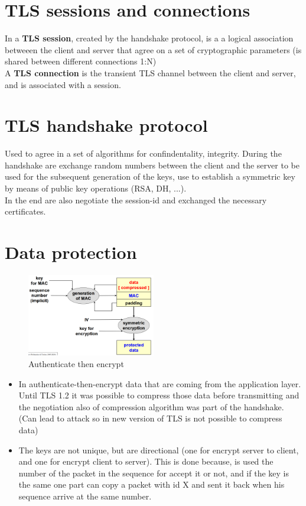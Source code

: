 \section{TLS sessions and connections}

In a \textbf{TLS session}, created by the handshake protocol, is a a logical association betweeen the client and server that agree on a set of cryptographic parameters (is shared between different connections 1:N) \\

A  \textbf{TLS connection} is the transient TLS channel between the client and server, and is associated with a session. \\

\section{TLS handshake protocol}
Used to agree in a set of algorithms for confindentality, integrity. During the handshake are exchange random numbers between the client and the server to be used for the subsequent generation of the keys, use to establish a symmetric key by means of public key operations (RSA, DH, ...). \\ 
In the end are also negotiate the session-id and exchanged the necessary certificates.

\newpage
\section{Data protection}

\begin{figure}[ht]
    \centering
    \includegraphics[width=0.5\textwidth]{img/data_protection.png}
    \caption{Authenticate then encrypt}
    \label{fig:data_prot}
\end{figure}
\begin{itemize}
    \item In authenticate-then-encrypt data that are coming from the application layer. Until TLS 1.2 it was possible to compress those data before transmitting and the negotiation also of compression algorithm was part of the handshake. (Can lead to attack so in new version of TLS is not possible to compress data)
    \item The keys are not unique, but are directional (one for encrypt server to client, and one for encrypt client to server). This is done because, is used the number of the packet in the sequence for accept it or not, and if the key is the same one part can copy a packet with id X and sent it back when his sequence arrive at the same number. 
\end{itemize}


